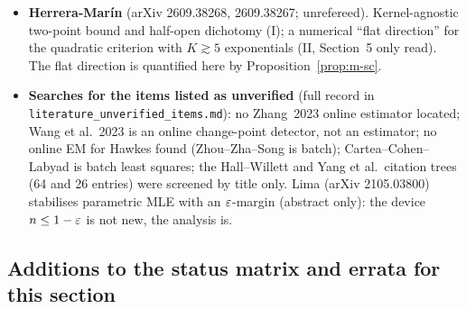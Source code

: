 \begin{itemize}[nosep]
\item \textbf{Herrera-Mar\'in} (arXiv 2609.38268, 2609.38267; unrefereed). Kernel-agnostic two-point bound and half-open dichotomy (I); a numerical ``flat direction'' for the quadratic criterion with $K\gtrsim5$ exponentials (II, Section~5 only read). The flat direction is quantified here by Proposition~\ref{prop:m-sc}.
\item \textbf{Searches for the items listed as unverified} (full record in \texttt{literature\_unverified\_items.md}): no Zhang~2023 online estimator located; Wang et al.\ 2023 is an online change-point detector, not an estimator; no online EM for Hawkes found (Zhou--Zha--Song is batch); Cartea--Cohen--Labyad is batch least squares; the Hall--Willett and Yang et al.\ citation trees (64 and 26 entries) were screened by title only. Lima (arXiv 2105.03800) stabilises parametric MLE with an $\varepsilon$-margin (abstract only): the device $n\le1-\varepsilon$ is not new, the analysis is.
\end{itemize}

\subsection{Additions to the status matrix and errata for this section}\label{sec:mis-status}

